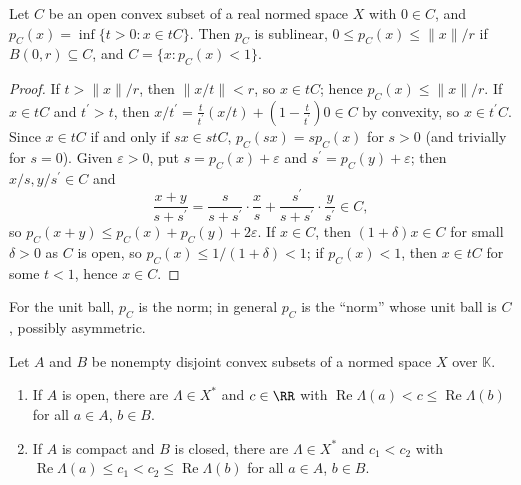 \begin{lemma}\label{functional-analysis:lemma-minkowski}
Let $C$ be an open convex subset of a real normed space $X$ with $0 \in C$, and $p_C(x) = \inf\{t > 0 : x \in tC\}$. Then $p_C$ is sublinear, $0 \leq p_C(x) \leq \|x\|/r$ if $B(0, r) \subseteq C$, and
$C = \{x : p_C(x) < 1\}$.
\end{lemma}

\begin{proof}
If $t > \|x\|/r$, then $\|x/t\| < r$, so $x \in tC$; hence $p_C(x) \leq \|x\|/r$. If $x \in tC$ and $t^{\prime} > t$, then $x/t^{\prime} = \frac{t}{t^{\prime}}(x/t) + (1 - \frac{t}{t^{\prime}})0 \in C$ by convexity, so $x \in t^{\prime}C$.
Since $x \in tC$ if and only if $sx \in stC$, $p_C(sx) = sp_C(x)$ for $s > 0$ (and trivially for $s = 0$). Given $\varepsilon > 0$, put $s = p_C(x) + \varepsilon$ and $s^{\prime} = p_C(y) + \varepsilon$; then $x/s, y/s^{\prime} \in C$ and
\[
\frac{x + y}{s + s^{\prime}} = \frac{s}{s + s^{\prime}}\cdot\frac xs + \frac{s^{\prime}}{s + s^{\prime}}\cdot\frac{y}{s^{\prime}} \in C,
\]
so $p_C(x + y) \leq p_C(x) + p_C(y) + 2\varepsilon$. If $x \in C$, then $(1 + \delta)x \in C$ for small $\delta > 0$ as $C$ is open, so $p_C(x) \leq 1/(1 + \delta) < 1$; if $p_C(x) < 1$, then $x \in tC$ for some $t < 1$, hence
$x \in C$.
\end{proof}

For the unit ball, $p_C$ is the norm; in general $p_C$ is the ``norm'' whose unit ball is $C$, possibly asymmetric.

\begin{theorem}\label{functional-analysis:theorem-separation}
Let $A$ and $B$ be nonempty disjoint convex subsets of a normed space $X$ over $\mathbb{K}$.
\begin{enumerate}
\item If $A$ is open, there are $\Lambda \in X^*$ and $c \in \RR$ with $\operatorname{Re}\Lambda(a) < c \leq \operatorname{Re}\Lambda(b)$ for all $a \in A$, $b \in B$.
\item If $A$ is compact and $B$ is closed, there are $\Lambda \in X^*$ and $c_1 < c_2$ with $\operatorname{Re}\Lambda(a) \leq c_1 < c_2 \leq \operatorname{Re}\Lambda(b)$ for all $a \in A$, $b \in B$.
\end{enumerate}
\end{theorem}

